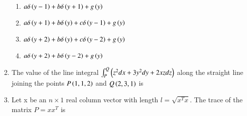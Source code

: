 \documentclass[a4paper, 11pt]{article}
\begin{document}
\begin{enumerate}
    \begin{enumerate}
        \item $a\delta\left(y-1\right)+b\delta\left(y+1\right)+g\left(y\right)$
        \item $a\delta\left(y+1\right)+b\delta\left(y\right)+c\delta\left(y-1\right)+g\left(y\right)$
        \item $a\delta\left(y+2\right)+b\delta\left(y\right)+c\delta\left(y-2\right)+g\left(y\right)$
        \item $a\delta\left(y+2\right)+b\delta\left(y-2\right)+g\left(y\right)$
    \end{enumerate}

    \hfill{}
    
    \item The value of the line integral $\int_{P}^{Q}\left(z^2dx + 3y^2dy + 2xz dz\right)$ along the straight line joining the points $P\left(1,1,2\right)$ and $Q\left(2,3,1\right)$ is
    
    \begin{enumerate}
    \end{enumerate}
    
    \hfill{}
    
    \item Let x be an $n \times 1$ real column vector with length $l = \sqrt{x^T x}$. The trace of the matrix $P=xx^T$ is
    
    \begin{enumerate}
    \end{enumerate}

    \hfill{}
    

\end{enumerate}
\end{document}
